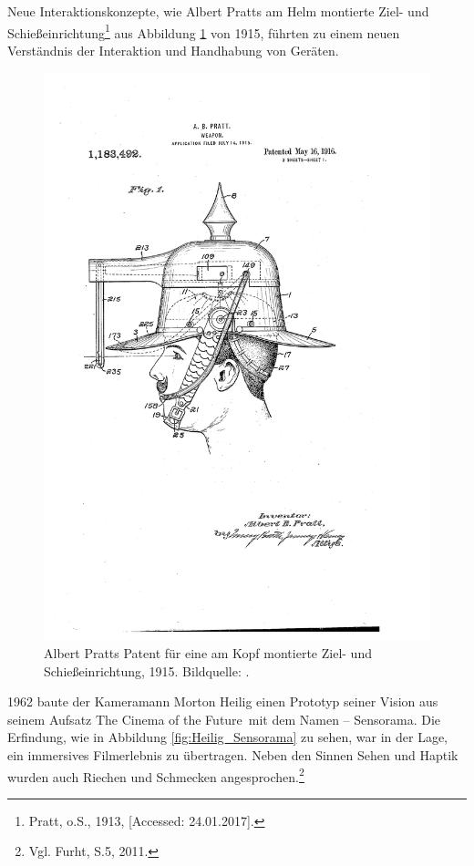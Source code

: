 Neue Interaktionskonzepte, wie Albert Pratts am Helm montierte Ziel- und Schießeinrichtung\footnote{ Pratt, o.S., 1913, [Accessed: 24.01.2017].} aus Abbildung \ref{fig:Pratt_HMD} von 1915, führten zu einem neuen Verständnis der Interaktion und Handhabung von Geräten.
\begin{figure}[H]
	\centering
	\includegraphics[width=.5\textwidth]{figuren/Pratt_US1183492-0}
	\caption{Albert Pratts Patent für eine am Kopf montierte Ziel- und Schießeinrichtung, 1915. Bildquelle: \cite{pratt}.}
	\label{fig:Pratt_HMD}
\end{figure}
1962 baute der Kameramann Morton Heilig einen Prototyp seiner Vision aus seinem Aufsatz \frqq The Cinema of the Future\flqq\ mit dem Namen -- Sensorama. Die Erfindung, wie in Abbildung \ref{fig:Heilig_Sensorama} zu sehen, war in der Lage, ein immersives Filmerlebnis zu übertragen. Neben den Sinnen Sehen und Haptik wurden auch Riechen und Schmecken angesprochen.\footnote{ Vgl. Furht, S.5, 2011.}
